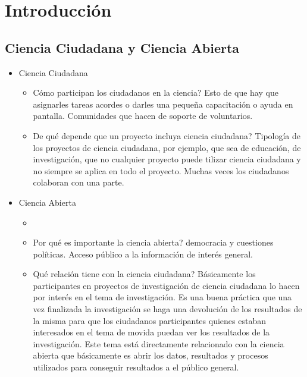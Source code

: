 \chapter{Introducción}

\label{introduccion}

\section{Ciencia  Ciudadana y Ciencia Abierta}

\begin{itemize}
   \item Ciencia Ciudadana
   \begin{itemize}
        \item Cómo participan los ciudadanos en la ciencia?        
        Esto de que hay que asignarles tareas acordes o darles una pequeña capacitación o ayuda en pantalla. Comunidades que hacen de soporte de voluntarios.
        \item De qué depende que un proyecto incluya ciencia ciudadana?
        Tipología de los proyectos de ciencia ciudadana, por ejemplo, que sea de educación, de investigación, que no cualquier proyecto puede tilizar ciencia ciudadana y no siempre se aplica en todo el proyecto. Muchas veces los ciudadanos colaboran con una parte.
   \end{itemize}   
   \item Ciencia Abierta   
   \begin{itemize}
        \item \item Por qué es importante la ciencia abierta? democracia y cuestiones políticas. Acceso público a la información de interés general. 
        \item Qué relación tiene con la ciencia ciudadana? Básicamente los participantes en proyectos de investigación de ciencia ciudadana lo hacen por interés en el tema de investigación. Es una buena práctica que una vez finalizada la investigación se haga una devolución de los resultados de la misma para que los ciudadanos participantes quienes estaban interesados en el tema de movida puedan ver los resultados de la investigación. Este tema está directamente relacionado con la ciencia abierta que básicamente es abrir los datos, resultados y procesos utilizados para conseguir resultados a el público general.
   \end{itemize}
\end{itemize}

